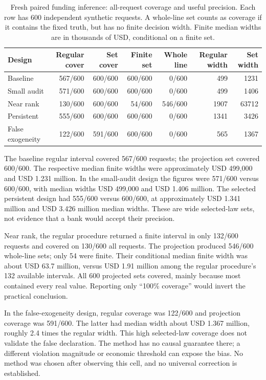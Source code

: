 \begin{table}[htbp]
\centering\small
\caption{Fresh paired funding inference: all-request coverage and useful precision. Each row has 600 independent synthetic requests. A whole-line set counts as coverage if it contains the fixed truth, but has no finite decision width. Finite median widths are in thousands of USD, conditional on a finite set.}
\label{integrated:weak_audit_projection:tab:weak-audit-results}
\begin{tabular}{lrrrrrr}
\toprule
Design & Regular cover & Set cover & Finite set & Whole line & Regular width & Set width \\
\midrule
Baseline & 567/600 & 600/600 & 600/600 & 0/600 & 499 & 1231 \\
Small audit & 571/600 & 600/600 & 600/600 & 0/600 & 499 & 1406 \\
Near rank & 130/600 & 600/600 & 54/600 & 546/600 & 1907 & 63712 \\
Persistent & 555/600 & 600/600 & 600/600 & 0/600 & 1341 & 3426 \\
False exogeneity & 122/600 & 591/600 & 600/600 & 0/600 & 565 & 1367 \\
\bottomrule
\end{tabular}
\end{table}


The baseline regular interval covered 567/600 requests; the projection set
covered 600/600. The respective median finite widths were approximately
USD 499,000 and USD 1.231 million. In the small-audit design the figures were
571/600 versus 600/600, with median widths USD 499,000 and USD 1.406 million.
The selected persistent design had 555/600 versus 600/600, at approximately
USD 1.341 million and USD 3.426 million median widths. These are wide
selected-law sets, not evidence that a bank would accept their precision.

Near rank, the regular procedure returned a finite interval in only 132/600
requests and covered on 130/600 all requests. The projection produced 546/600
whole-line sets; only 54 were finite. Their conditional median finite width
was about USD 63.7 million, versus USD 1.91 million among the regular
procedure's 132 available intervals. All 600 projected sets covered, mainly
because most contained every real value. Reporting only ``100\% coverage''
would invert the practical conclusion.

In the false-exogeneity design, regular coverage was 122/600 and projection
coverage was 591/600. The latter had median width about USD 1.367 million,
roughly 2.4 times the regular width. This high selected-law coverage does not
validate the false declaration. The method has no causal guarantee there;
a different violation magnitude or economic threshold can expose the bias.
No method was chosen after observing this cell, and no universal correction
is established.

